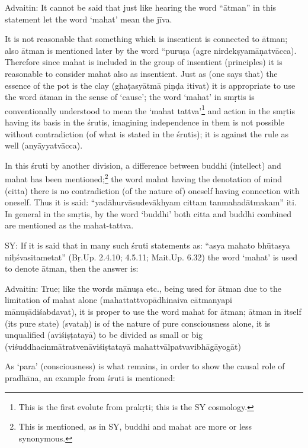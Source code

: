 Advaitin: It cannot be said that just like hearing the word “ātman” in this statement let the word ‘mahat’ mean the jīva.

It is not reasonable that something which is insentient is connected to ātman; also ātman is mentioned later by the word “puruṣa (agre nirdekṣyamāṇatvācca). Therefore since mahat is included in the group of insentient (principles) it is reasonable to consider mahat also as insentient. Just as (one says that) the essence of the pot is the clay (ghaṭasyātmā piṇḍa itivat) it is appropriate to use the word ātman in the sense of ‘cause’; the word ‘mahat’ in smṛtis is conventionally understood to mean the ‘mahat tattva’\footnote{This is the first evolute from prakṛti; this is the SY cosmology.} and action in the smṛtis having its basis in the śrutis, imagining  independence in them is not possible without contradiction (of what is stated in the śrutis); it is against the rule as well (anyāyyatvācca). 

In this śruti by another division, a difference between buddhi (intellect) and mahat has been mentioned;\footnote{This is mentioned, as in SY, buddhi and mahat are more or less synonymous.} the word mahat having the denotation of mind (citta) there is no contradiction (of the nature of) oneself having connection with oneself. Thus it is said: “yadāhurvāsudevākhyam cittam tanmahadātmakam” iti. In general in the smṛtis, by the word ‘buddhi’ both citta and buddhi combined  are mentioned as the mahat-tattva.

SY: If it is said that in many such śruti statements as: “asya mahato bhūtasya niḥśvasitametat” (Bṛ.Up. 2.4.10; 4.5.11; Mait.Up. 6.32) the word ‘mahat’ is used to denote ātman, then the answer is:

Advaitin: True; like the words mānuṣa etc., being used for ātman due to the limitation of mahat alone (mahattattvopādhinaiva cātmanyapi mānuṣādiśabdavat), it is proper to use the word mahat for ātman; ātman in itself (its pure state) (svataḥ) is of the nature of pure consciousness alone, it is unqualified (aviśiṣṭatayā) to be divided as small or big (viśuddhacinmātratvenāviśiṣtatayā mahattvālpatvavibhāgāyogāt) 

As ‘para’ (consciousness) is what remains, in order to show the causal role of pradhāna, an example from śruti is mentioned:

\textbf{}


